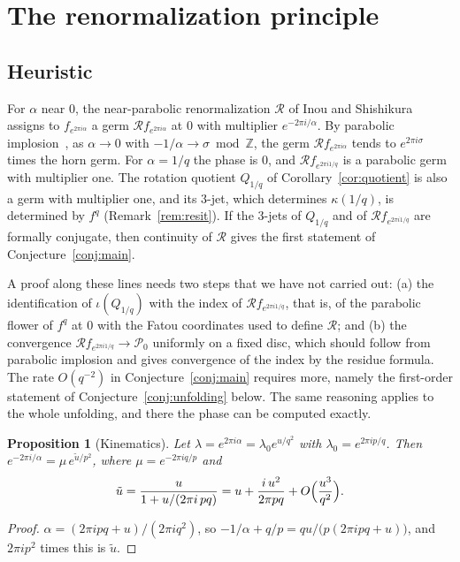 \documentclass[11pt]{amsart}
\newtheorem{proposition}[theorem]{Proposition}
\theoremstyle{definition}
\theoremstyle{remark}
\newcommand{\Z}{\mathbb{Z}}
\newcommand{\PP}{\mathcal{P}_0}
\newcommand{\fa}[1]{f_{e^{2\pi i#1}}}
\begin{document}
\section{The renormalization principle}\label{sec:renorm}

\subsection{Heuristic}
For $\alpha$ near $0$, the near-parabolic renormalization $\mathcal R$ of Inou and Shishikura~\cite{IS} assigns to $\fa{\alpha}$ a germ $\mathcal R\fa{\alpha}$ at $0$ with multiplier $e^{-2\pi i/\alpha}$. By parabolic implosion~\cite{Lavaurs,Sh}, as $\alpha\to0$ with $-1/\alpha\to\sigma\bmod\Z$, the germ $\mathcal R\fa{\alpha}$ tends to $e^{2\pi i\sigma}$ times the horn germ. For $\alpha=1/q$ the phase is $0$, and $\mathcal R\fa{1/q}$ is a parabolic germ with multiplier one. The rotation quotient $Q_{1/q}$ of Corollary~\ref{cor:quotient} is also a germ with multiplier one, and its $3$-jet, which determines $\kappa(1/q)$, is determined by $f^q$ (Remark~\ref{rem:resit}). If the $3$-jets of $Q_{1/q}$ and of $\mathcal R\fa{1/q}$ are formally conjugate, then continuity of $\mathcal R$ gives the first statement of Conjecture~\ref{conj:main}.

A proof along these lines needs two steps that we have not carried out: (a) the identification of $\iota(Q_{1/q})$ with the index of $\mathcal R\fa{1/q}$, that is, of the parabolic flower of $f^q$ at $0$ with the Fatou coordinates used to define $\mathcal R$; and (b) the convergence $\mathcal R\fa{1/q}\to\PP$ uniformly on a fixed disc, which should follow from parabolic implosion and gives convergence of the index by the residue formula. The rate $O(q^{-2})$ in Conjecture~\ref{conj:main} requires more, namely the first-order statement of Conjecture~\ref{conj:unfolding} below. The same reasoning applies to the whole unfolding, and there the phase can be computed exactly.

\begin{proposition}[Kinematics]\label{prop:kinematic}
Let $\lambda=e^{2\pi i\alpha}=\lambda_0e^{u/q^2}$ with $\lambda_0=e^{2\pi ip/q}$. Then $e^{-2\pi i/\alpha}=\mu\,e^{\tilde u/p^2}$, where $\mu=e^{-2\pi iq/p}$ and
\[
\tilde u=\frac{u}{1+u/(2\pi i\,pq)}=u+\frac{i\,u^2}{2\pi pq}+O\Bigl(\frac{u^3}{q^2}\Bigr).
\]
\end{proposition}

\begin{proof}
$\alpha=(2\pi ipq+u)/(2\pi iq^2)$, so $-1/\alpha+q/p=qu/\bigl(p(2\pi ipq+u)\bigr)$, and $2\pi i p^2$ times this is $\tilde u$.
\end{proof}
\end{document}
